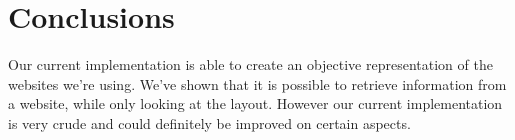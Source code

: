 \chapter{Conclusions}\label{conclusions}
Our current implementation is able to create an objective representation of the websites we're using. 
We've shown that it is possible to retrieve information from a website, while only looking at the layout. However our current implementation is very crude and could definitely be improved on certain aspects.\\

